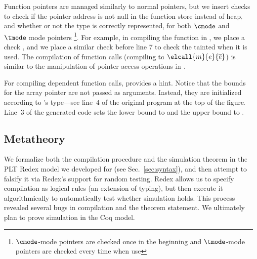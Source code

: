 %
Function pointers are managed similarly to normal pointers,
but we insert checks to check if the pointer address is not null in 
the function store instead of heap, and whether or not the type is correctly represented, 
for both $\cmode$ and $\tmode$ mode pointers 
\footnote{$\cmode$-mode pointers are checked once in the beginning and $\tmode$-mode pointers are checked every time when use}.
For example, in compiling the  function in ,
we place a check ,
and we place a similar check before  line 7 to check the tainted  when it is used. 
The compilation of function calls (compiling to $\elcall{m}{e}{\overline{e}}$) 
is similar to the manipulation of pointer access operations in .

For compiling dependent function calls,
 provides a hint.
Notice that the bounds for the array pointer  are not passed as
arguments. Instead, they are initialized according to 's
type---see line~4 of the original \lang program at the top of the figure.
Line~$3$ of the generated code
sets the lower bound  to  and the
upper bound to .

\subsection{Metatheory}
\label{sec:meta}


We formalize both the compilation procedure and the simulation
theorem in the PLT Redex model we developed for \lang (see Sec.~\ref{sec:syntax}),
and then attempt to falsify it via Redex's support for random
testing. Redex allows us
  to specify compilation as logical rules (an extension
  of typing), but then execute it algorithmically to
  automatically test whether simulation holds. This process revealed
  several bugs in compilation and the theorem statement.
%
We ultimately plan to prove simulation in the Coq model.

